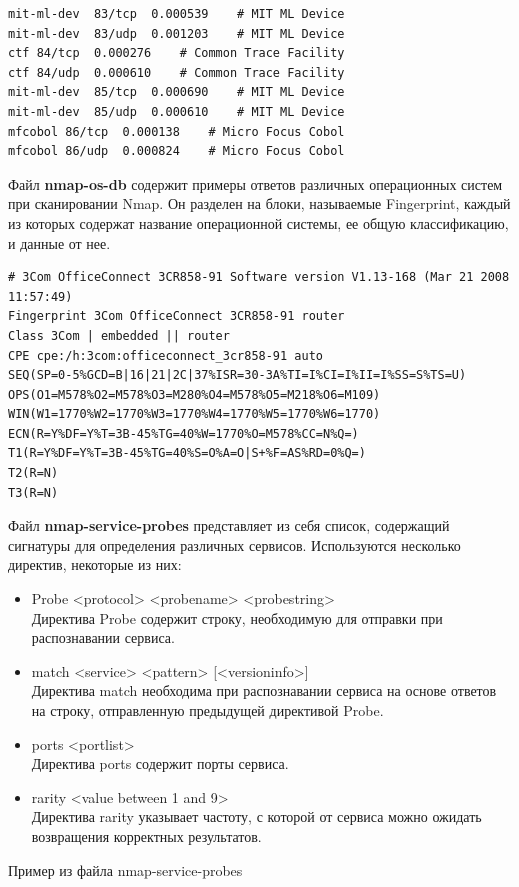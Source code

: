 \documentclass[10pt,a4paper]{report}
\begin{document}
\begin{verbatim}
mit-ml-dev	83/tcp	0.000539	# MIT ML Device
mit-ml-dev	83/udp	0.001203	# MIT ML Device
ctf	84/tcp	0.000276	# Common Trace Facility
ctf	84/udp	0.000610	# Common Trace Facility
mit-ml-dev	85/tcp	0.000690	# MIT ML Device
mit-ml-dev	85/udp	0.000610	# MIT ML Device
mfcobol	86/tcp	0.000138	# Micro Focus Cobol
mfcobol	86/udp	0.000824	# Micro Focus Cobol
\end{verbatim}
Файл \textbf{nmap-os-db} содержит примеры ответов различных операционных систем при сканировании Nmap. Он разделен на блоки, называемые Fingerprint, каждый из которых содержат  название операционной системы, ее общую классификацию, и данные от нее. 
\begin{verbatim}
# 3Com OfficeConnect 3CR858-91 Software version V1.13-168 (Mar 21 2008 11:57:49)
Fingerprint 3Com OfficeConnect 3CR858-91 router
Class 3Com | embedded || router
CPE cpe:/h:3com:officeconnect_3cr858-91 auto
SEQ(SP=0-5%GCD=B|16|21|2C|37%ISR=30-3A%TI=I%CI=I%II=I%SS=S%TS=U)
OPS(O1=M578%O2=M578%O3=M280%O4=M578%O5=M218%O6=M109)
WIN(W1=1770%W2=1770%W3=1770%W4=1770%W5=1770%W6=1770)
ECN(R=Y%DF=Y%T=3B-45%TG=40%W=1770%O=M578%CC=N%Q=)
T1(R=Y%DF=Y%T=3B-45%TG=40%S=O%A=O|S+%F=AS%RD=0%Q=)
T2(R=N)
T3(R=N)
\end{verbatim}
Файл \textbf{nmap-service-probes} представляет из себя список, содержащий сигнатуры для определения различных сервисов. Используются несколько директив, некоторые из них:
\begin{itemize}
\item Probe <protocol> <probename> <probestring> \\ Директива Probe содержит строку, необходимую для отправки при распознавании сервиса.
\item match <service> <pattern> [<versioninfo>]\\
Директива match необходима при распознавании сервиса на основе ответов на строку, отправленную предыдущей директивой Probe.
\item ports <portlist>\\
Директива ports содержит порты сервиса.
\item rarity <value between 1 and 9> \\
Директива rarity указывает частоту, с которой от сервиса можно ожидать возвращения корректных результатов.
\end{itemize}
Пример из файла nmap-service-probes
\end{document}
